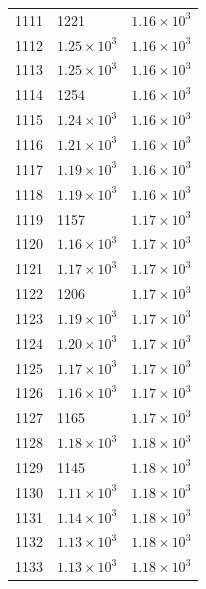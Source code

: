\begin{table}[H]
\begin{tabular}{lll}
1111 & 1221 & $\displaystyle 1.16 \times 10^{3}$ \\
1112 & $\displaystyle 1.25 \times 10^{3}$ & $\displaystyle 1.16 \times 10^{3}$ \\
1113 & $\displaystyle 1.25 \times 10^{3}$ & $\displaystyle 1.16 \times 10^{3}$ \\
1114 & 1254 & $\displaystyle 1.16 \times 10^{3}$ \\
1115 & $\displaystyle 1.24 \times 10^{3}$ & $\displaystyle 1.16 \times 10^{3}$ \\
1116 & $\displaystyle 1.21 \times 10^{3}$ & $\displaystyle 1.16 \times 10^{3}$ \\
1117 & $\displaystyle 1.19 \times 10^{3}$ & $\displaystyle 1.16 \times 10^{3}$ \\
1118 & $\displaystyle 1.19 \times 10^{3}$ & $\displaystyle 1.16 \times 10^{3}$ \\
1119 & 1157 & $\displaystyle 1.17 \times 10^{3}$ \\
1120 & $\displaystyle 1.16 \times 10^{3}$ & $\displaystyle 1.17 \times 10^{3}$ \\
1121 & $\displaystyle 1.17 \times 10^{3}$ & $\displaystyle 1.17 \times 10^{3}$ \\
1122 & 1206 & $\displaystyle 1.17 \times 10^{3}$ \\
1123 & $\displaystyle 1.19 \times 10^{3}$ & $\displaystyle 1.17 \times 10^{3}$ \\
1124 & $\displaystyle 1.20 \times 10^{3}$ & $\displaystyle 1.17 \times 10^{3}$ \\
1125 & $\displaystyle 1.17 \times 10^{3}$ & $\displaystyle 1.17 \times 10^{3}$ \\
1126 & $\displaystyle 1.16 \times 10^{3}$ & $\displaystyle 1.17 \times 10^{3}$ \\
1127 & 1165 & $\displaystyle 1.17 \times 10^{3}$ \\
1128 & $\displaystyle 1.18 \times 10^{3}$ & $\displaystyle 1.18 \times 10^{3}$ \\
1129 & 1145 & $\displaystyle 1.18 \times 10^{3}$ \\
1130 & $\displaystyle 1.11 \times 10^{3}$ & $\displaystyle 1.18 \times 10^{3}$ \\
1131 & $\displaystyle 1.14 \times 10^{3}$ & $\displaystyle 1.18 \times 10^{3}$ \\
1132 & $\displaystyle 1.13 \times 10^{3}$ & $\displaystyle 1.18 \times 10^{3}$ \\
1133 & $\displaystyle 1.13 \times 10^{3}$ & $\displaystyle 1.18 \times 10^{3}$ \\

\end{tabular}
\end{table}
